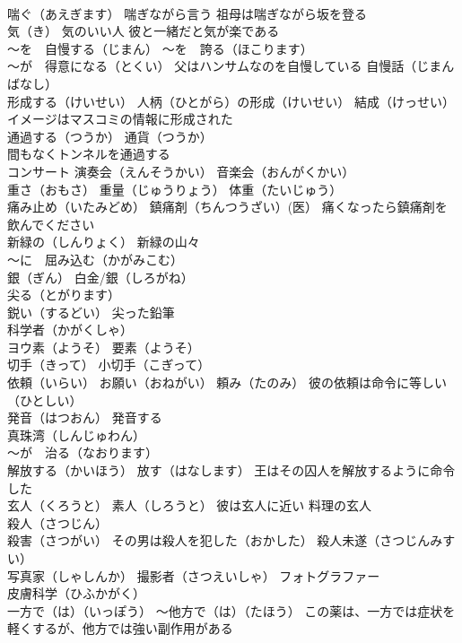 \documentclass[8pt]{extreport}
\begin{document}
\begin{CJK}{UTF8}{min}
\\	喘ぐ（あえぎます） 喘ぎながら言う 祖母は喘ぎながら坂を登る
\\	気（き） 気のいい人 彼と一緒だと気が楽である
\\	～を　自慢する（じまん） ～を　誇る（ほこります） 
\\	～が　得意になる（とくい） 父はハンサムなのを自慢している 自慢話（じまんばなし）
\\	形成する（けいせい） 人柄（ひとがら）の形成（けいせい） 結成（けっせい） イメージはマスコミの情報に形成された
\\	通過する（つうか） 通貨（つうか） 
\\	間もなくトンネルを通過する
\\	コンサート 演奏会（えんそうかい） 音楽会（おんがくかい）
\\	重さ（おもさ） 重量（じゅうりょう） 体重（たいじゅう）
\\	痛み止め（いたみどめ） 鎮痛剤（ちんつうざい）(医） 痛くなったら鎮痛剤を飲んでください
\\	新緑の（しんりょく） 新緑の山々
\\	～に　屈み込む（かがみこむ）
\\	銀（ぎん） 白金/銀（しろがね）
\\	尖る（とがります）
\\	鋭い（するどい） 尖った鉛筆
\\	科学者（かがくしゃ）
\\	ヨウ素（ようそ） 要素（ようそ）
\\	切手（きって） 小切手（こぎって）
\\	依頼（いらい） お願い（おねがい） 頼み（たのみ） 彼の依頼は命令に等しい（ひとしい）
\\	発音（はつおん） 発音する
\\	真珠湾（しんじゅわん）
\\	～が　治る（なおります）
\\	解放する（かいほう） 放す（はなします） 王はその囚人を解放するように命令した
\\	玄人（くろうと） 素人（しろうと） 彼は玄人に近い 料理の玄人
\\	殺人（さつじん）
\\	殺害（さつがい） その男は殺人を犯した（おかした） 殺人未遂（さつじんみすい）
\\	写真家（しゃしんか） 撮影者（さつえいしゃ） フォトグラファー
\\	皮膚科学（ひふかがく）
\\	一方で（は）（いっぽう） ～他方で（は）（たほう） この薬は、一方では症状を軽くするが、他方では強い副作用がある

\end{CJK}
\end{document}

